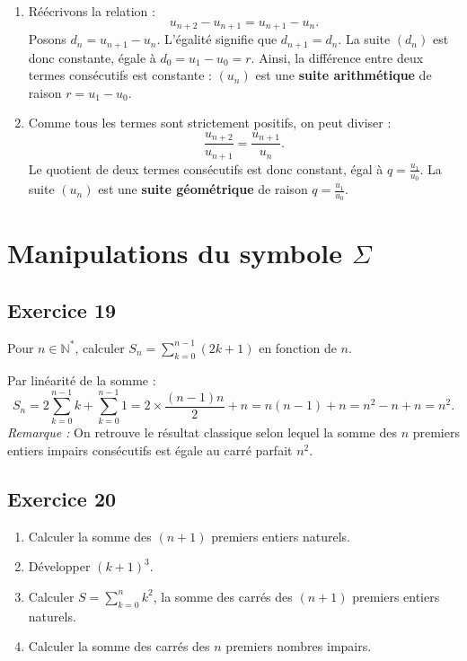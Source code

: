 \documentclass[11pt,a4paper]{article}
\newcommand{\N}{\mathbb{N}}
\begin{document}
\begin{correctionbox}
\begin{enumerate}
    \item Réécrivons la relation :
    \[
    u_{n+2} - u_{n+1} = u_{n+1} - u_n.
    \]
    Posons $d_n = u_{n+1} - u_n$. L'égalité signifie que $d_{n+1} = d_n$. La suite $(d_n)$ est donc constante, égale à $d_0 = u_1 - u_0 = r$.
    Ainsi, la différence entre deux termes consécutifs est constante : $(u_n)$ est une \textbf{suite arithmétique} de raison $r = u_1 - u_0$.
    \item Comme tous les termes sont strictement positifs, on peut diviser :
    \[
    \frac{u_{n+2}}{u_{n+1}} = \frac{u_{n+1}}{u_n}.
    \]
    Le quotient de deux termes consécutifs est donc constant, égal à $q = \frac{u_1}{u_0}$.
    La suite $(u_n)$ est une \textbf{suite géométrique} de raison $q = \frac{u_1}{u_0}$.
\end{enumerate}
\end{correctionbox}


\section{Manipulations du symbole $\Sigma$}

\subsection*{Exercice 19}
Pour $n \in \N^*$, calculer $S_n = \sum_{k=0}^{n-1} (2k+1)$ en fonction de $n$.

\begin{correctionbox}
Par linéarité de la somme :
\[
S_n = 2 \sum_{k=0}^{n-1} k + \sum_{k=0}^{n-1} 1 = 2 \times \frac{(n-1)n}{2} + n = n(n-1) + n = n^2 - n + n = n^2.
\]
\textit{Remarque :} On retrouve le résultat classique selon lequel la somme des $n$ premiers entiers impairs consécutifs est égale au carré parfait $n^2$.
\end{correctionbox}

\subsection*{Exercice 20}
\begin{enumerate}
    \item Calculer la somme des $(n+1)$ premiers entiers naturels.
    \item Développer $(k+1)^3$.
    \item Calculer $S = \sum_{k=0}^n k^2$, la somme des carrés des $(n+1)$ premiers entiers naturels.
    \item Calculer la somme des carrés des $n$ premiers nombres impairs.
\end{enumerate}
\end{document}
